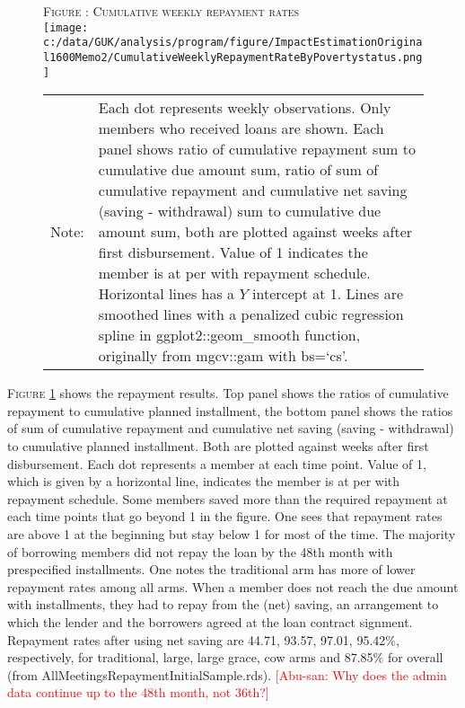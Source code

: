 \begin{figure}
\hfil\textsc{\footnotesize Figure \thefigure: Cumulative weekly repayment rates\label{fig weeklysavingrepayrate}}\\
\hfil\texttt{[image: c:/data/GUK/analysis/program/figure/ImpactEstimationOriginal1600Memo2/CumulativeWeeklyRepaymentRateByPovertystatus.png]}\\
\renewcommand{\arraystretch}{1}
\hfil\begin{tabular}{>{\hfill\scriptsize}p{1cm}<{}>{\scriptsize}p{12cm}<{\hfill}}
Note:& Each dot represents weekly observations. Only members who received loans are shown. Each panel shows ratio of cumulative repayment sum to cumulative due amount sum, ratio of sum of cumulative repayment and cumulative net saving (saving - withdrawal) sum to cumulative due amount sum, both are plotted against weeks after first disbursement. Value of 1 indicates the member is at per with repayment schedule. Horizontal lines has a $Y$ intercept at 1. Lines are smoothed lines with a penalized cubic regression spline in \textsf{ggplot2::geom\_smooth} function, originally from \textsf{mgcv::gam} with \textsf{bs=`cs'}. \\[-1ex]
\end{tabular}
\end{figure}


	\textsc{\footnotesize Figure \ref{fig weeklysavingrepayrate}} shows the repayment results. Top panel shows the ratios of cumulative repayment to cumulative planned installment, the bottom panel shows the ratios of sum of cumulative repayment and cumulative net saving (saving - withdrawal) to cumulative planned installment. Both are plotted against weeks after first disbursement. Each dot represents a member at each time point. Value of 1, which is given by a horizontal line, indicates the member is at per with repayment schedule. Some members saved more than the required repayment at each time points that go beyond 1 in the figure. One sees that repayment rates are above 1 at the beginning but stay below 1 for most of the time. The majority of borrowing members did not repay the loan by the 48th month with prespecified installments. One notes the \textsf{traditional} arm has more of lower repayment rates among all arms. When a member does not reach the due amount with installments, they had to repay from the (net) saving, an arrangement to which the lender and the borrowers agreed at the loan contract signment. Repayment rates after using net saving are 44.71, 93.57, 97.01, 95.42\%, respectively, for \textsf{traditional, large, large grace, cow} arms and 87.85\% for overall (from \textsf{\footnotesize AllMeetingsRepaymentInitialSample.rds}). \textcolor{red}{[Abu-san: Why does the admin data continue up to the 48th month, not 36th?]}

